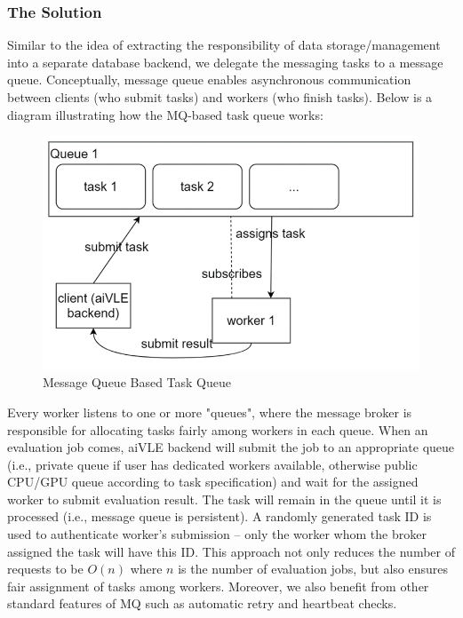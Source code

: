 \subsubsection{The Solution}
Similar to the idea of extracting the responsibility of data storage/management into a separate database backend, we delegate the messaging tasks to a message queue. Conceptually, message queue enables asynchronous communication between clients (who submit tasks) and workers (who finish tasks). Below is a diagram illustrating how the MQ-based task queue works:
\begin{figure}[H]
    \centering
    \includegraphics{images/aivle-web-mq.png}
    \caption{Message Queue Based Task Queue}
    \label{fig:aivle-web-mq}
\end{figure}
Every worker listens to one or more "queues", where the message broker is responsible for allocating tasks fairly among workers in each queue. When an evaluation job comes, aiVLE backend will submit the job to an appropriate queue (i.e., private queue if user has dedicated workers available, otherwise public CPU/GPU queue according to task specification) and wait for the assigned worker to submit evaluation result. The task will remain in the queue until it is processed (i.e., message queue is persistent). A randomly generated task ID is used to authenticate worker's submission – only the worker whom the broker assigned the task will have this ID. This approach not only reduces the number of requests to be $O(n)$ where $n$ is the number of evaluation jobs, but also ensures fair assignment of tasks among workers. Moreover, we also benefit from other standard features of MQ such as automatic retry and heartbeat checks.


